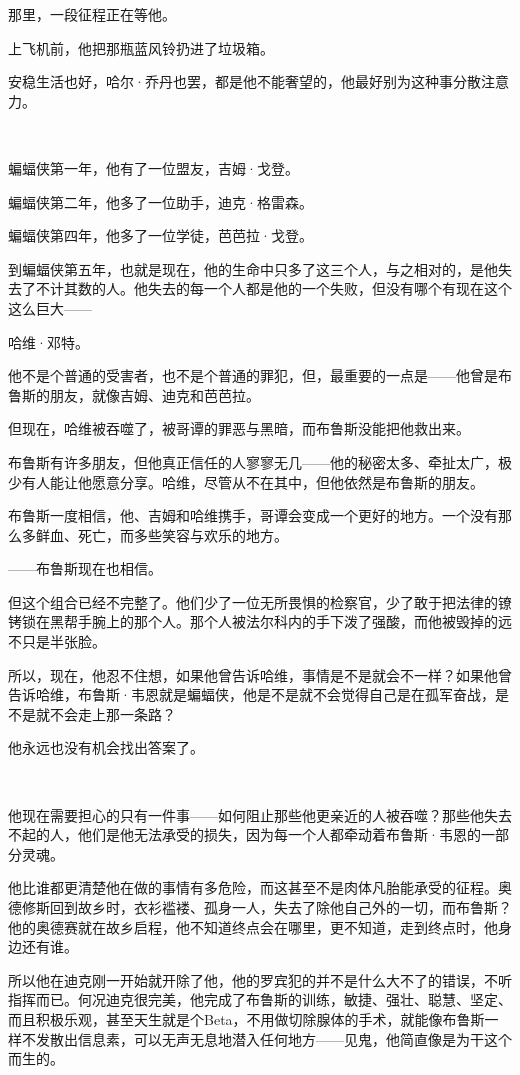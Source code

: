 \documentclass[../main]{subfiles}
\begin{document}
那里，一段征程正在等他。

上飞机前，他把那瓶蓝风铃扔进了垃圾箱。

安稳生活也好，哈尔·乔丹也罢，都是他不能奢望的，他最好别为这种事分散注意力。

~\

蝙蝠侠第一年，他有了一位盟友，吉姆·戈登。

蝙蝠侠第二年，他多了一位助手，迪克·格雷森。

蝙蝠侠第四年，他多了一位学徒，芭芭拉·戈登。

到蝙蝠侠第五年，也就是现在，他的生命中只多了这三个人，与之相对的，是他失去了不计其数的人。他失去的每一个人都是他的一个失败，但没有哪个有现在这个这么巨大——

哈维·邓特。

他不是个普通的受害者，也不是个普通的罪犯，但，最重要的一点是——他曾是布鲁斯的朋友，就像吉姆、迪克和芭芭拉。

但现在，哈维被吞噬了，被哥谭的罪恶与黑暗，而布鲁斯没能把他救出来。

布鲁斯有许多朋友，但他真正信任的人寥寥无几——他的秘密太多、牵扯太广，极少有人能让他愿意分享。哈维，尽管从不在其中，但他依然是布鲁斯的朋友。

布鲁斯一度相信，他、吉姆和哈维携手，哥谭会变成一个更好的地方。一个没有那么多鲜血、死亡，而多些笑容与欢乐的地方。

——布鲁斯现在也相信。

但这个组合已经不完整了。他们少了一位无所畏惧的检察官，少了敢于把法律的镣铐锁在黑帮手腕上的那个人。那个人被法尔科内的手下泼了强酸，而他被毁掉的远不只是半张脸。

所以，现在，他忍不住想，如果他曾告诉哈维，事情是不是就会不一样？如果他曾告诉哈维，布鲁斯·韦恩就是蝙蝠侠，他是不是就不会觉得自己是在孤军奋战，是不是就不会走上那一条路？

他永远也没有机会找出答案了。

~\

他现在需要担心的只有一件事——如何阻止那些他更亲近的人被吞噬？那些他失去不起的人，他们是他无法承受的损失，因为每一个人都牵动着布鲁斯·韦恩的一部分灵魂。

他比谁都更清楚他在做的事情有多危险，而这甚至不是肉体凡胎能承受的征程。奥德修斯回到故乡时，衣衫褴褛、孤身一人，失去了除他自己外的一切，而布鲁斯？他的奥德赛就在故乡启程，他不知道终点会在哪里，更不知道，走到终点时，他身边还有谁。

所以他在迪克刚一开始就开除了他，他的罗宾犯的并不是什么大不了的错误，不听指挥而已。何况迪克很完美，他完成了布鲁斯的训练，敏捷、强壮、聪慧、坚定、而且积极乐观，甚至天生就是个Beta，不用做切除腺体的手术，就能像布鲁斯一样不发散出信息素，可以无声无息地潜入任何地方——见鬼，他简直像是为干这个而生的。
\end{document}
